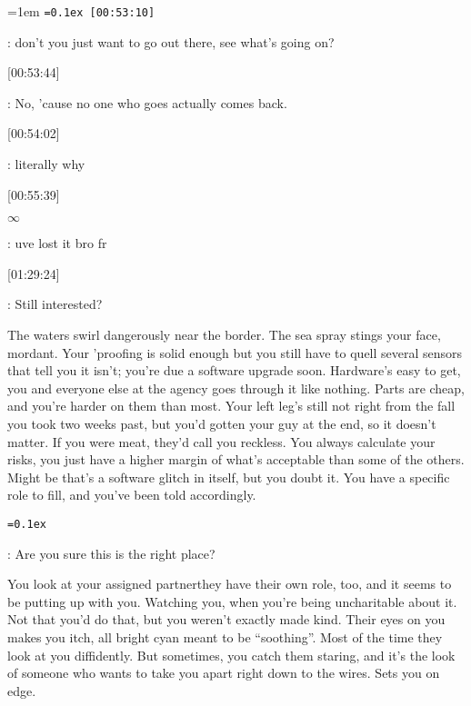 \newlength{\userwidth}
\userwidth=1em
\newcommand{\userthorn}{\parbox{\userwidth}{\TH}}
\newcommand{\usermu}{\parbox{\userwidth}{\textmu}}
\newcommand{\userdag}{\parbox{\userwidth}{\dag}}
\newcommand{\userddag}{\parbox{\userwidth}{\ddag}}
\newcommand{\userOmega}{\parbox{\userwidth}{\textOmega}}
\newcommand{\userSigma}{\parbox{\userwidth}{\textSigma}}
\newcommand{\userinfty}{\parbox{\userwidth}{$\infty$}}
\newcommand{\useromega}{\parbox{\userwidth}{\textomega}}
\newcommand{\pesterlog}[1]{\vspace{\parskip}\begingroup\tt\parskip=0.1ex#1\vspace{0.1ex}\endgroup}
\pesterlog{
[00:53:10] \userthorn: don't you just want to go out there, see what's going on?

[00:53:44] \userSigma: No, 'cause no one who goes actually comes back.

[00:54:02] \userdag: literally why

[00:55:39] \userinfty: uve lost it bro fr

[01:29:24] \useromega: Still interested?
}

\hsep

The waters swirl dangerously near the border. The sea spray stings your face, mordant. Your 'proofing is solid enough but you still have to quell several sensors that tell you it isn't; you're due a software upgrade soon. Hardware's easy to get, you and everyone else at the agency goes through it like nothing. Parts are cheap, and you're harder on them than most. Your left leg's still not right from the fall you took two weeks past, but you'd gotten your guy at the end, so it doesn't matter. If you were meat, they'd call you reckless. You always calculate your risks, you just have a higher margin of what's acceptable than some of the others. Might be that's a software glitch in itself, but you doubt it. You have a specific role to fill, and you've been told accordingly.

\pesterlog{
\usermu: Are you sure this is the right place?
}

You look at your assigned partner\textemdash they have their own role, too, and it seems to be putting up with you. Watching you, when you're being uncharitable about it. Not that you'd do that, but you weren't exactly made kind. Their eyes on you makes you itch, all bright cyan meant to be ``soothing''. Most of the time they look at you diffidently. But sometimes, you catch them staring, and it's the look of someone who wants to take you apart right down to the wires. Sets you on edge.

